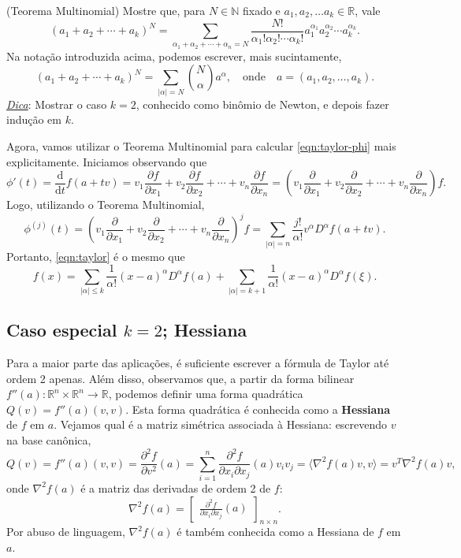 \begin{exer}(Teorema Multinomial)
	Mostre que, para $N \in \mathbb{N}$ fixado e $a_1, a_2, \dots a_k \in \mathbb{R}$, vale
	\[
	(a_1 + a_2 + \cdots + a_k)^N = \sum_{\alpha_1 + \alpha_2 + \cdots + \alpha_n = N} \frac{N!}{\alpha_1 ! \alpha_2 ! \cdots  \alpha_k!} a_1^{\alpha_1} a_2^{\alpha_2} \cdots  a_k^{\alpha_k}.
	\] Na notação introduzida acima, podemos escrever, mais sucintamente,
	\[
	(a_1 + a_2 + \cdots + a_k)^N = \sum_{|\alpha|  = N} \binom{N}{\alpha} a^\alpha, \quad \text{onde} \quad a = (a_1, a_2, \dots, a_k).
	\] \underline{\textit{Dica}}: Mostrar o caso $k=2$, conhecido como binômio de Newton, e depois fazer indução em $k$.
\end{exer}

Agora, vamos utilizar o Teorema Multinomial para calcular \eqref{eqn:taylor-phi} mais explicitamente. Iniciamos observando que
\[
\phi'(t) = \frac{\mathrm{d} }{\mathrm{d}  t} f(a + t v) = v_1 \frac{\partial f}{\partial x_1} + v_2 \frac{\partial f}{\partial x_2} + \cdots + v_n \frac{\partial f}{\partial x_n} = \left( v_1 \frac{\partial }{\partial x_1} + v_2 \frac{\partial }{\partial x_2} + \cdots + v_n \frac{\partial }{\partial x_n}  \right) f.
\] Logo, utilizando o Teorema Multinomial,
\[
\phi^{(j)}(t) = \left( v_1 \frac{\partial }{\partial x_1} + v_2 \frac{\partial }{\partial x_2} + \cdots + v_n \frac{\partial }{\partial x_n}  \right)^{j} f = \sum_{|\alpha| = n} \frac{j!}{\alpha!} v^\alpha D^{\alpha} f (a + tv).
\] Portanto, \eqref{eqn:taylor} é o mesmo que
\[
f(x) = \sum_{|\alpha| \le k} \frac{1}{\alpha!} (x-a)^\alpha D^{\alpha} f (a) + \sum_{|\alpha| = k+1} \frac{1}{\alpha!} (x-a)^\alpha D^{\alpha} f (\xi).
\]


\subsection{Caso especial $k=2$; Hessiana}

Para a maior parte das aplicações, é suficiente escrever a fórmula de Taylor até ordem 2 apenas. Além disso, observamos que, a partir da forma bilinear $f''(a): \mathbb{R}^n \times \mathbb{R}^n \to \mathbb{R}$, podemos definir uma forma quadrática $Q(v) = f''(a) (v,v)$. Esta forma quadrática é conhecida como a \textbf{Hessiana} de $f$ em $a$. Vejamos qual é a matriz simétrica associada à Hessiana: escrevendo $v$ na base canônica,
\[
Q(v) = f''(a) (v,v) = \frac{\partial^2 f}{\partial v^2} (a) = \sum_{i=1}^{n} \frac{\partial^2 f}{\partial x_i \partial x_j} (a) v_i v_j = \langle \nabla^2 f (a) v, v \rangle = v^T \nabla^2 f (a) v,
\] onde $\nabla^2 f (a)$ é a matriz das derivadas de ordem 2 de $f$:
\[
\nabla^2 f (a) = 
\begin{bmatrix}
\frac{\partial^2 f}{\partial x_i \partial x_j} (a)
\end{bmatrix}_{n \times n}.
\] Por abuso de linguagem, $\nabla^2 f (a)$ é também conhecida como a Hessiana de $f$ em $a$.

